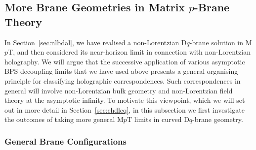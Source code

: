 \documentclass[11pt]{article}
\begin{document}
\subsection{More Brane Geometries in Matrix \texorpdfstring{$p$}{p}-Brane Theory} \label{sec:morebranegeos}

In Section~\ref{sec:nlbdal}, we have realised a non-Lorentzian D$q$-brane solution in M$p$T, and then considered its near-horizon limit in connection with non-Lorentzian holography. 
We will argue that the successive application of various asymptotic BPS decoupling limits that we have used above presents a general organising principle for classifying holographic correspondences. Such correspondences in general will involve non-Lorentzian bulk geometry and non-Lorentzian field theory at the asymptotic infinity. To motivate this viewpoint, which we will set out in more detail in Section~\ref{sec:chdlcq}, in this subsection we first investigate the outcomes of taking more general M$p$T limits in curved D$q$-brane geometry. 

\subsubsection{General Brane Configurations} \label{sec:gbc}
\end{document}
